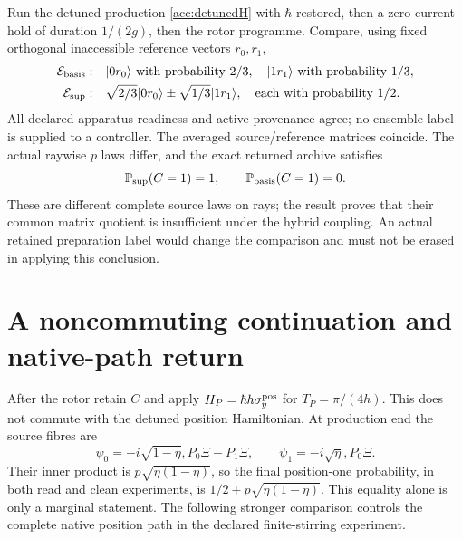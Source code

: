 \documentclass[11pt,oneside,openany]{book}
\theoremstyle{definition}
\theoremstyle{remark}\newtheorem{remark}[theorem]{Remark}
\begin{document}
Run the detuned production \eqref{acc:detunedH} with $\hbar$ restored,
then a zero-current hold of duration $1/(2g)$, then the rotor programme.
Compare, using fixed orthogonal inaccessible reference vectors $r_0,r_1$,
\begin{align*}
 \mathcal E_{
\rm basis}:&\quad |0r_0\rangle\text{ with probability }2/3,
 \quad |1r_1\rangle\text{ with probability }1/3,\\
 \mathcal E_{
\rm sup}:&\quad
 \sqrt{2/3}|0r_0\rangle\pm\sqrt{1/3}|1r_1\rangle,
 \quad\text{each with probability }1/2.
\end{align*}
All declared apparatus readiness and active provenance agree; no ensemble
label is supplied to a controller. The averaged source/reference matrices
coincide. The actual raywise $p$ laws differ, and the exact returned
archive satisfies
\begin{equation}
 \mathbb P_{
\rm sup}(C=1)=1,\qquad
 \mathbb P_{
\rm basis}(C=1)=0.
 \label{acc:rotorgap}
\end{equation}
These are different complete source laws on rays; the result proves that
their common matrix quotient is insufficient under the hybrid coupling.
An actual retained preparation label would change the comparison and must
not be erased in applying this conclusion.

\section{A noncommuting continuation and native-path return}
After the rotor retain $C$ and apply
$H_P=\hbar h\sigma_y^{\rm pos}$ for $T_P=\pi/(4h)$.
This does not commute with the detuned position Hamiltonian.
At production end the source fibres are
\[
 \psi_0=-i\sqrt{1-\eta},P_0\Xi-P_1\Xi,\qquad
 \psi_1=-i\sqrt\eta,P_0\Xi.
\]
Their inner product is $p\sqrt{\eta(1-\eta)}$, so the final
position-one probability, in both read and clean experiments, is
$1/2+p\sqrt{\eta(1-\eta)}$. This equality alone is only a marginal
statement. The following stronger comparison controls the complete native
position path in the declared finite-stirring experiment.
\end{document}
